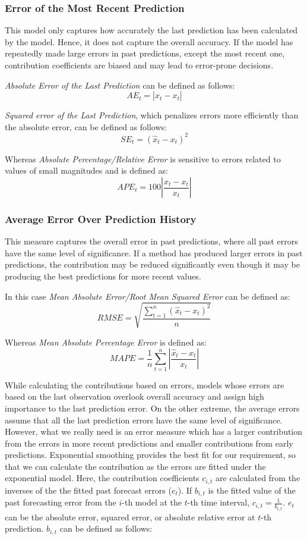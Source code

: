 \subsubsection{Error of the Most Recent Prediction}
This model only captures how accurately the last prediction has been calculated by the model. Hence, it does not capture the overall accuracy. If the model has repeatedly made large errors in past predictions, except the most recent one, contribution coefficients are biased and may lead to error-prone decisions.

\noindent
\textit{Absolute Error of the Last Prediction} can be defined as follows:
$$AE_t=|\hat{x}_t-x_t|$$

\noindent
\textit{Squared error of the Last Prediction}, which penalizes errors more efficiently than the absolute error, can be defined as follows:
$$SE_t=(\hat{x}_t-x_t)^2$$

\noindent
Whereas \textit{Absolute Percentage/Relative Error} is sensitive to errors related to values of small magnitudes and is defined as:
$$APE_t=100\left |\frac{\hat{x}_t-x_t}{x_t}  \right |$$

\subsubsection{Average Error Over Prediction History}
This measure captures the overall error in past predictions, where all past errors have the same level of significance. If a method has produced larger errors in past predictions, the contribution may be reduced significantly even though it may be producing the best predictions for more recent values.

\noindent
In this case \textit{Mean Absolute Error/Root Mean Squared Error} can be defined as:
$$RMSE=\sqrt{\frac{\sum_{t=1}^{n}(\hat{x}_{t}-x_{t})^{2}}{n}}$$ 

\noindent
Whereas \textit{Mean Absolute Percentage Error} is defined as:
$$MAPE=\frac{1}{n}\sum_{t=1}^{n}\left | \frac{\hat{x}_{t}-x_{t}}{x_{t}} \right |$$

While calculating the contributions based on errors, models whose errors are based on the last observation overlook overall accuracy and assign high importance to the last prediction error. On the other extreme, the average errors assume that all the last prediction errors have the same level of significance. However, what we really need is an error measure which has a larger contribution from the errors in more recent predictions and smaller contributions from early predictions. Exponential smoothing provides the best fit for our requirement, so that we can calculate the contribution as the errors are fitted under the exponential model. Here, the contribution coefficients $c_{i,t}$ are calculated from the inverses of the the fitted past forecast errors ($e_{t}$). If $b_{i,t}$ is the fitted value of the past forecasting error from the $i$-th model at the $t$-th time interval, $c_{i,t}=\frac{1}{b_{i,t}}$. $e_{t}$ can be the absolute error, squared error, or absolute relative error at $t$-th prediction. $b_{i,t}$ can be defined as follows:

